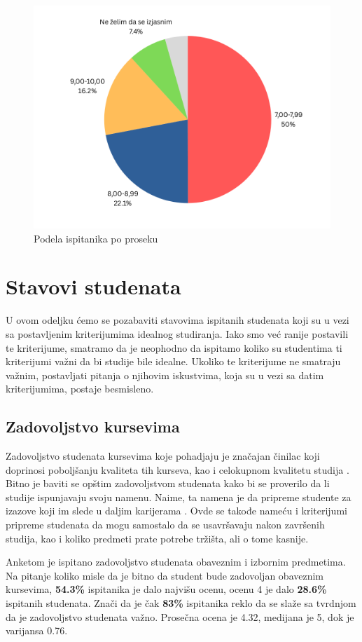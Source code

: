 \documentclass[a4paper]{article}
\begin{document}
{\begin{figure}[H]
    \centering
    \includegraphics[width=0.7\linewidth]{prosek.png}
    \caption{Podela ispitanika po proseku}
    \label{fig:raspodela_prosek}
\end{figure}

\section{Stavovi studenata}
\label{sec:stavovi}


U ovom odeljku ćemo se pozabaviti stavovima ispitanih studenata koji su u vezi sa postavljenim kriterijumima idealnog studiranja. Iako smo već ranije postavili te kriterijume, smatramo da je neophodno da ispitamo koliko su studentima ti kriterijumi važni da bi studije bile idealne. Ukoliko te kriterijume ne smatraju važnim, postavljati pitanja o njihovim iskustvima, koja su u vezi sa datim kriterijumima, postaje besmisleno.


\subsection{Zadovoljstvo kursevima}
\label{subsec:zadovoljstvo_stavovi}

Zadovoljstvo studenata kursevima koje pohadjaju je značajan činilac koji doprinosi poboljšanju kvaliteta tih kurseva, kao i celokupnom kvalitetu studija \cite{satisfaction}. Bitno je baviti se opštim zadovoljstvom studenata kako bi se proverilo da li studije ispunjavaju svoju namenu. Naime, ta namena je da pripreme studente za izazove koji im slede u daljim karijerama \cite{education}. Ovde se takođe nameću i kriterijumi pripreme studenata da mogu samostalo da se usavršavaju nakon završenih studija, kao i koliko predmeti prate potrebe tržišta, ali o tome kasnije.

Anketom je ispitano zadovoljstvo studenata obaveznim i izbornim predmetima. Na pitanje koliko misle da je bitno da student bude zadovoljan obaveznim kursevima, \textbf{54.3\%} ispitanika je dalo najvišu ocenu, ocenu 4 je dalo \textbf{28.6\%} ispitanih studenata. Znači da je čak \textbf{83\%} ispitanika reklo da se slaže sa tvrdnjom da je zadovoljstvo studenata važno. Prosečna ocena je 4.32, medijana je 5, dok je varijansa 0.76.

}
\end{document}

